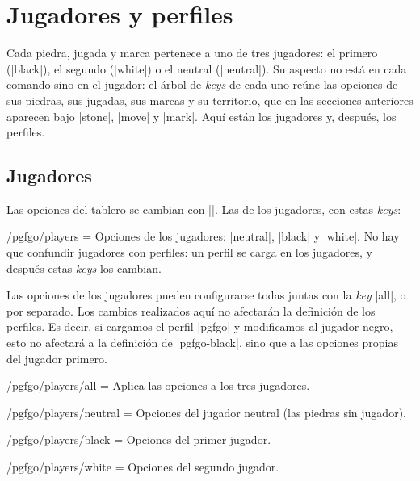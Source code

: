 \section{Jugadores y perfiles}
\label{sec:jugadores}

Cada piedra, jugada y marca pertenece a uno de tres jugadores: el primero (|black|), el segundo (|white|) o el neutral (|neutral|). Su aspecto no está en cada comando sino en el jugador: el árbol de \emph{keys} de cada uno reúne las opciones de sus piedras, sus jugadas, sus marcas y su territorio, que en las secciones anteriores aparecen bajo |stone|, |move| y |mark|. Aquí están los jugadores y, después, los perfiles.

\subsection{Jugadores}

Las opciones del tablero se cambian con ||. Las de los jugadores, con estas \emph{keys}:

\begin{key}{/pgfgo/players = }
	Opciones de los jugadores: |neutral|, |black| y |white|. No hay que confundir jugadores con perfiles: un perfil se carga en los jugadores, y después estas \emph{keys} los cambian.
\end{key}

Las opciones de los jugadores pueden configurarse todas juntas con la \emph{key} |all|, o por separado. Los cambios realizados aquí no afectarán la definición de los perfiles. Es decir, si cargamos el perfil |pgfgo| y modificamos al jugador negro, esto no afectar\'a a la definici\'on de |pgfgo-black|, sino que a las opciones propias del jugador primero.

\begin{key}{/pgfgo/players/all = }
	Aplica las opciones a los tres jugadores.
\end{key}

\begin{key}{/pgfgo/players/neutral = }
	Opciones del jugador neutral (las piedras sin jugador).
\end{key}

\begin{key}{/pgfgo/players/black = }
	Opciones del primer jugador.
\end{key}

\begin{key}{/pgfgo/players/white = }
	Opciones del segundo jugador.

	\begin{codeexample}[width=4cm]

		\begin{goban}[3]
		\end{goban}
	\end{codeexample}
\end{key}

